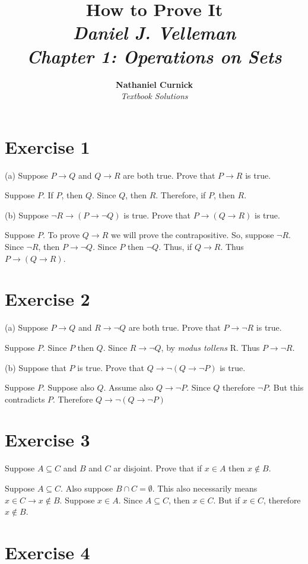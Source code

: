 \documentclass[11pt]{article}
\title{\textbf{How to Prove It} \\ {\Large\itshape Daniel J. Velleman} \\ {\Large\itshape Chapter 1: Operations on Sets}}
\author{\textbf{Nathaniel Curnick} \\ \textit{Textbook Solutions}}
\date{}
\newcommand{\then}{\rightarrow}
\begin{document}
\maketitle

\section*{Exercise 1}

\noindent (a) Suppose $P \then Q$ and $Q \then R$ are both true. Prove that 
$P \then R$ is true.

Suppose $P$. If $P$, then $Q$. Since $Q$, then $R$. Therefore, if $P$, then $R$.

\noindent (b) Suppose $\neg R \then (P \then \neg Q)$ is true. Prove that 
$P \then (Q \then R)$ is true.

Suppose $P$. To prove $Q \then R$ we will prove the contrapositive. So, suppose 
$\neg R$. Since $\neg R$, then $P \then \neg Q$. Since $P$ then $\neg Q$. Thus,
if $Q \then R$. Thus $P \then (Q \then R)$.

\section*{Exercise 2}

\noindent (a) Suppose $P \then Q$ and $R \then \neg Q$ are both true. Prove that 
$P \then \neg R$ is true.

Suppose $P$. Since $P$ then $Q$. Since $R \then \neg Q$, by 
\textit{modus tollens} R. Thus $P \then \neg R$.

\noindent (b) Suppose that $P$ is true. Prove that 
$Q \then \neg (Q \then \neg P)$ is true.

Suppose $P$. Suppose also $Q$. Assume also $Q \then \neg P$. Since $Q$ therefore 
$\neg P$. But this contradicts $P$. Therefore $Q \then \neg (Q \then \neg P)$

\section*{Exercise 3}

Suppose $A \subseteq C$ and $B$ and $C$ ar disjoint. Prove that if $x \in A$
then $x \notin B$.

Suppose $A \subseteq C$. Also suppose $B \cap C = \emptyset$. This also 
necessarily means $x \in C \then x \notin B$. Suppose $x \in A$. Since 
$A \subseteq C$, then $x \in C$. But if $x \in C$, therefore $x \notin B$.

\section*{Exercise 4}
\end{document}
